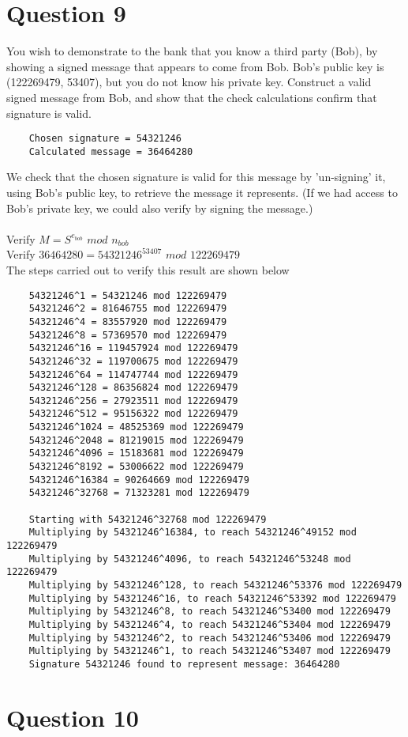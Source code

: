 \documentclass[a4paper,12pt]{article}
\begin{document}
\section*{Question 9}
You wish to demonstrate to the bank that you know a third party (Bob), by showing a signed message that appears to come from Bob. Bob’s public key is (122269479, 53407), but you do not know his private key. Construct a valid signed message from Bob, and show that the check calculations confirm that signature is valid.
\begin{verbatim}
    Chosen signature = 54321246
    Calculated message = 36464280
\end{verbatim}
We check that the chosen signature is valid for this message by 'un-signing' it, using Bob's public key, to retrieve the message it represents. (If we had access to Bob's private key, we could also verify by signing the message.)\\\\
Verify $M = S^{e_{bob}}$ $mod$ $n_{bob}$\\
Verify $36464280 = 54321246^{53407}$ $mod$ $122269479$\\
The steps carried out to verify this result are shown below
\begin{verbatim}
    54321246^1 = 54321246 mod 122269479
    54321246^2 = 81646755 mod 122269479
    54321246^4 = 83557920 mod 122269479
    54321246^8 = 57369570 mod 122269479
    54321246^16 = 119457924 mod 122269479
    54321246^32 = 119700675 mod 122269479
    54321246^64 = 114747744 mod 122269479
    54321246^128 = 86356824 mod 122269479
    54321246^256 = 27923511 mod 122269479
    54321246^512 = 95156322 mod 122269479
    54321246^1024 = 48525369 mod 122269479
    54321246^2048 = 81219015 mod 122269479
    54321246^4096 = 15183681 mod 122269479
    54321246^8192 = 53006622 mod 122269479
    54321246^16384 = 90264669 mod 122269479
    54321246^32768 = 71323281 mod 122269479

    Starting with 54321246^32768 mod 122269479
    Multiplying by 54321246^16384, to reach 54321246^49152 mod 122269479
    Multiplying by 54321246^4096, to reach 54321246^53248 mod 122269479
    Multiplying by 54321246^128, to reach 54321246^53376 mod 122269479
    Multiplying by 54321246^16, to reach 54321246^53392 mod 122269479
    Multiplying by 54321246^8, to reach 54321246^53400 mod 122269479
    Multiplying by 54321246^4, to reach 54321246^53404 mod 122269479
    Multiplying by 54321246^2, to reach 54321246^53406 mod 122269479
    Multiplying by 54321246^1, to reach 54321246^53407 mod 122269479
    Signature 54321246 found to represent message: 36464280
\end{verbatim}

\section*{Question 10}
\end{document}
